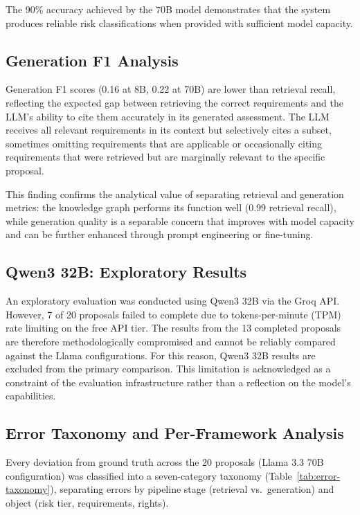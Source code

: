 The 90\% accuracy achieved by the 70B model demonstrates that the system produces reliable risk classifications when provided with sufficient model capacity.


\subsection{Generation F1 Analysis}

Generation F1 scores (0.16 at 8B, 0.22 at 70B) are lower than retrieval recall, reflecting the expected gap between retrieving the correct requirements and the LLM's ability to cite them accurately in its generated assessment. The LLM receives all relevant requirements in its context but selectively cites a subset, sometimes omitting requirements that are applicable or occasionally citing requirements that were retrieved but are marginally relevant to the specific proposal.

This finding confirms the analytical value of separating retrieval and generation metrics: the knowledge graph performs its function well (0.99 retrieval recall), while generation quality is a separable concern that improves with model capacity and can be further enhanced through prompt engineering or fine-tuning.


\subsection{Qwen3 32B: Exploratory Results}
\label{sec:qwen-ratelimit}

An exploratory evaluation was conducted using Qwen3 32B via the Groq API. However, 7 of 20 proposals failed to complete due to tokens-per-minute (TPM) rate limiting on the free API tier. The results from the 13 completed proposals are therefore methodologically compromised and cannot be reliably compared against the Llama configurations. For this reason, Qwen3 32B results are excluded from the primary comparison. This limitation is acknowledged as a constraint of the evaluation infrastructure rather than a reflection on the model's capabilities.

\subsection{Error Taxonomy and Per-Framework Analysis}
\label{sec:error-taxonomy}

Every deviation from ground truth across the 20 proposals (Llama 3.3 70B configuration) was classified into a seven-category taxonomy (Table~\ref{tab:error-taxonomy}), separating errors by pipeline stage (retrieval vs.\ generation) and object (risk tier, requirements, rights).

